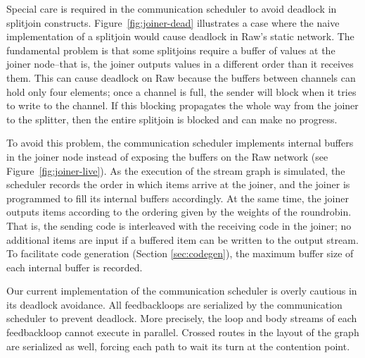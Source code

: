 Special care is required in the communication scheduler to avoid
deadlock in splitjoin constructs.  Figure~\ref{fig:joiner-dead}
illustrates a case where the naive implementation of a splitjoin would
cause deadlock in Raw's static network.  The fundamental problem is
that some splitjoins require a buffer of values at the joiner
node--that is, the joiner outputs values in a different order than it
receives them.  This can cause deadlock on Raw because the buffers
between channels can hold only four elements; once a channel is full,
the sender will block when it tries to write to the channel.  If this
blocking propagates the whole way from the joiner to the splitter,
then the entire splitjoin is blocked and can make no progress.

To avoid this problem, the communication scheduler implements internal
buffers in the joiner node instead of exposing the buffers on the Raw
network (see Figure~\ref{fig:joiner-live}).  As the execution of the
stream graph is simulated, the scheduler records the order in which
items arrive at the joiner, and the joiner is programmed to fill its
internal buffers accordingly.  At the same time, the joiner outputs
items according to the ordering given by the weights of the
roundrobin.  That is, the sending code is interleaved with the
receiving code in the joiner; no additional items are input if a
buffered item can be written to the output stream.  To facilitate code
generation (Section \ref{sec:codegen}), the maximum buffer size of
each internal buffer is recorded.

Our current implementation of the communication scheduler is overly
cautious in its deadlock avoidance.  All feedbackloops are serialized
by the communication scheduler to prevent deadlock.  More precisely,
the loop and body streams of each feedbackloop cannot execute in
parallel.  Crossed routes in the layout of the graph are serialized as
well, forcing each path to wait its turn at the contention point.
